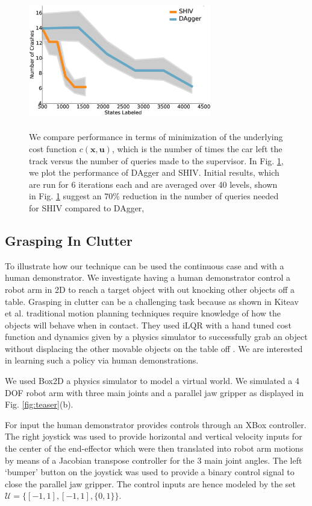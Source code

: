 \documentclass[10pt, conference]{ieeeconf}      %
\newcommand{\bu}{\mathbf{u}}
\newcommand{\bx}{\mathbf{x}}
\begin{document}
\begin{figure}[t!]
\centering
\includegraphics[width=8cm, height=6cm]{figures/dagger_shiv_one_class.eps}
\caption{We compare performance in terms of minimization of the underlying cost function $c(\bx,\bu)$, which is the  number of times the car left the track versus the number of queries made to the supervisor. In Fig. \ref{fig:car_cost}, we plot the performance of DAgger and SHIV.  Initial results, which are run for 6 iterations each and are averaged over 40 levels, shown in Fig. \ref{fig:car_cost} suggest an $70\%$ reduction in the number of queries needed for SHIV compared to DAgger,}
\vspace*{-10pt}
\label{fig:car_cost}
\end{figure}


\subsection{Grasping In Clutter}
To illustrate how our technique can be used the continuous case and with a human demonstrator. 
We investigate having a human demonstrator control a robot arm in 2D to reach a target object with out knocking other objects off a table. Grasping in clutter can be a challenging task because as shown in Kiteav et al. traditional motion planning techniques require knowledge of how the objects will behave when in contact. They used iLQR with a hand tuned cost function and dynamics given by a physics simulator to successfully grab an object without displacing the other movable objects on the table off \cite{kitaevphysics}. We are interested in learning such a policy via human demonstrations.   

We used Box2D a physics simulator to model a virtual world. We simulated a 4 DOF robot arm with three main joints and a parallel jaw gripper as
displayed in Fig. \ref{fig:teaser}(b). 

For input the human demonstrator provides controls through an XBox controller. The right joystick was used to
    provide horizontal and vertical velocity inputs for the center of the end-effector which were then translated into
robot arm motions by means of a Jacobian transpose controller for the 3 main joint angles. The left `bumper' button on the joystick was used to provide a binary control signal to close the parallel jaw
gripper. The control inputs are hence modeled by the set $\mathcal{U} = \lbrace [-1,1],[-1,1],\lbrace 0,1 \rbrace \rbrace$.  
\end{document}

